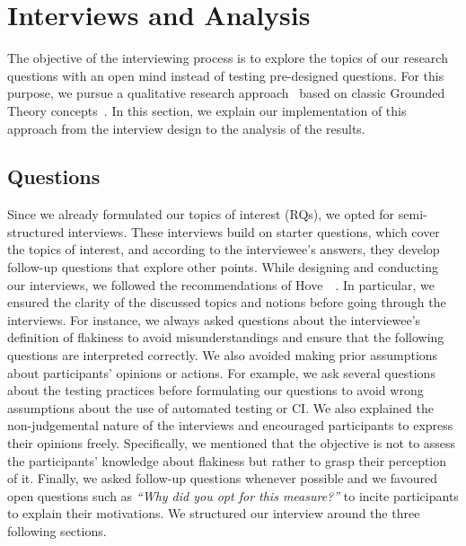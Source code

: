 \section{Interviews and Analysis}
\label{sec:survey-interviews}

The objective of the interviewing process is to explore the topics of our research questions with an open mind instead of testing pre-designed questions.
For this purpose, we pursue a qualitative research approach~\cite{creswell2017research} based on classic Grounded Theory concepts~\cite{adolph2011using}. 
In this section, we explain our implementation of this approach from the interview design to the analysis of the results.
\subsection{Questions}
Since we already formulated our topics of interest (RQs), we opted for semi-structured interviews.
These interviews build on starter questions, which cover the topics of interest, and according to the interviewee's answers, they develop follow-up questions that explore other points.
While designing and conducting our interviews, we followed the recommendations of Hove~\etal~\cite{hove2005experiences}.
In particular, we ensured the clarity of the discussed topics and notions before going through the interviews.
For instance, we always asked questions about the interviewee's definition of flakiness to avoid misunderstandings and ensure that the following questions are interpreted correctly.
We also avoided making prior assumptions about participants' opinions or actions.
For example, we ask several questions about the testing practices before formulating our questions to avoid wrong assumptions about the use of automated testing or CI. 
We also explained the non-judgemental nature of the interviews and encouraged participants to express their opinions freely.
Specifically, we mentioned that the objective is not to assess the participants' knowledge about flakiness but rather to grasp their perception of it.
Finally, we asked follow-up questions whenever possible and we favoured open questions such as \textit{``Why did you opt for this measure?''} to incite participants to explain their motivations.
We structured our interview around the three following sections.
